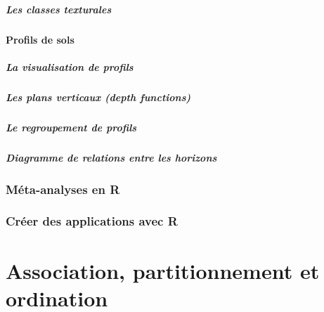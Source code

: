 \documentclass[]{book}
\let\oldparagraph\paragraph
\renewcommand{\paragraph}[1]{\oldparagraph{#1}\mbox{}}
\begin{document}
\hypertarget{les-classes-texturales}{%
\paragraph{Les classes texturales}\label{les-classes-texturales}}

\hypertarget{profils-de-sols}{%
\subsubsection{Profils de sols}\label{profils-de-sols}}

\hypertarget{la-visualisation-de-profils}{%
\paragraph{La visualisation de
profils}\label{la-visualisation-de-profils}}

\hypertarget{les-plans-verticaux-depth-functions}{%
\paragraph{Les plans verticaux (depth
functions)}\label{les-plans-verticaux-depth-functions}}

\hypertarget{le-regroupement-de-profils}{%
\paragraph{Le regroupement de
profils}\label{le-regroupement-de-profils}}

\hypertarget{diagramme-de-relations-entre-les-horizons}{%
\paragraph{Diagramme de relations entre les
horizons}\label{diagramme-de-relations-entre-les-horizons}}

\hypertarget{muxe9ta-analyses-en-r}{%
\subsection{Méta-analyses en R}\label{muxe9ta-analyses-en-r}}

\hypertarget{cruxe9er-des-applications-avec-r}{%
\subsection{Créer des applications avec
R}\label{cruxe9er-des-applications-avec-r}}

\hypertarget{chapitre-ordination}{%
\chapter{Association, partitionnement et
ordination}\label{chapitre-ordination}}
\end{document}
